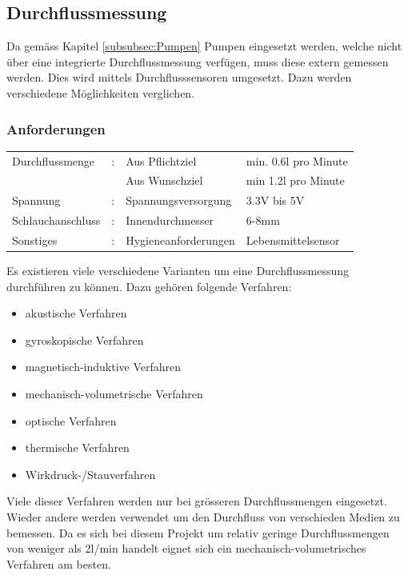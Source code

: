 \subsection{Durchflussmessung}
\label{subsec:Durchflussmessung}

Da gemäss Kapitel \ref{subsubsec:Pumpen} Pumpen eingesetzt werden, welche nicht über eine integrierte Durchflussmessung verfügen, muss diese extern gemessen werden. Dies wird mittels Durchflusssensoren umgesetzt. Dazu werden verschiedene Möglichkeiten verglichen.

\subsubsection{Anforderungen}\label{par:Anforderungen_Durchflussmessung}

\begin{tabularx}{\textwidth}{lllX}
Durchflussmenge & : & Aus Pflichtziel & min. 0.6l pro Minute\\
 & & Aus Wunschziel & min 1.2l pro Minute \\
Spannung & : & Spannungsversorgung & 3.3V bis 5V \\
Schlauchanschluss & : & Innendurchmesser & 6-8mm \\
Sonstiges & : & Hygieneanforderungen & Lebensmittelsensor \\
\end{tabularx}

Es existieren viele verschiedene Varianten um eine Durchflussmessung durchführen zu können. Dazu gehören folgende Verfahren:

\begin{itemize}
\item akustische Verfahren
\item gyroskopische Verfahren
\item magnetisch-induktive Verfahren
\item mechanisch-volumetrische Verfahren
\item optische Verfahren
\item thermische Verfahren
\item Wirkdruck-/Stauverfahren
\end{itemize}

Viele dieser Verfahren werden nur bei grösseren Durchflussmengen eingesetzt. Wieder andere werden verwendet um den Durchfluss von verschieden Medien zu bemessen. Da es sich bei diesem Projekt um relativ geringe Durchflussmengen von weniger als 2l/min handelt eignet sich ein mechanisch-volumetrisches Verfahren am besten. \cite{alfaomega_durchflussmesser_2019}


